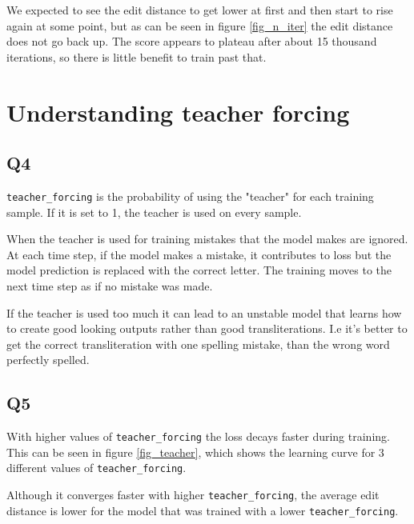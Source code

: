 \documentclass[12pt]{article}
\begin{document}
We expected to see the edit distance to get lower at first and then start to rise again at some point, but as can be seen in figure \ref{fig_n_iter} the edit distance does not go back up. The score appears to plateau after about 15 thousand iterations, so there is little benefit to train past that.

\section{Understanding teacher forcing}

\subsection{Q4}

\texttt{teacher\_forcing} is the probability of using the "teacher" for each training sample. If it is set to 1, the teacher is used on every sample.

When the teacher is used for training mistakes that the model makes are ignored. At each time step, if the model makes a mistake, it contributes to loss but the model prediction is replaced with the correct letter. The training moves to the next time step as if no mistake was made.

If the teacher is used too much it can lead to an unstable model that learns how to create good looking outputs rather than good transliterations. I.e it's better to get the correct transliteration with one spelling mistake, than the wrong word perfectly spelled.

\subsection{Q5}
 
With higher values of \texttt{teacher\_forcing} the loss decays faster during training. This can be seen in figure \ref{fig_teacher}, which shows the learning curve for 3 different values of \texttt{teacher\_forcing}.

Although it converges faster with higher \texttt{teacher\_forcing}, the average edit distance is lower for the model that was trained with a lower \texttt{teacher\_forcing}. 
\end{document}
